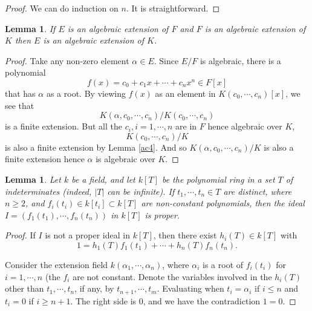 \documentclass[12pt]{report}
\newtheorem{lemma}[thm]{Lemma}
\theoremstyle{definition}
\def\aa{\alpha}
\begin{document}
\begin{proof}
    We can do induction on $n$. It is straightforward.
\end{proof}

\begin{lemma}\label{ac3}
    If $E$ is an algebraic extension of $F$ and $F$ is an algebraic extension of $K$ then $E$ is an algebraic extension of $K$.
\end{lemma}

\begin{proof}
    Take any non-zero element $\aa\in E$. Since $E/F$ is algebraic, there is a polynomial $$f(x)=c_0+c_1x+\cdots+c_n x^n\in F[x]$$ that has $\aa$ as a root. By viewing $f(x)$ as an element in $K(c_0,\cdots,c_n)[x]$, we see that $$K(\aa,c_0,\cdots,c_n)/K(c_0,\cdots,c_n)$$ is a finite extension. But all the $c_i, i=1,\cdots, n$ are in $F$ hence algebraic over $K$,$$K(c_0,\cdots,c_n)/K$$ is also a finite extension by Lemma \ref{ac4}. And so $K(\aa,c_0,\cdots,c_n)/K$ is also a finite extension hence $\aa$ is algebraic over $K$. 
\end{proof}

\begin{lemma}\label{ac2}
    Let $k$ be a field, and let $k[T]$ be the polynomial ring in a set $T$ of indeterminates (indeed, $|T|$ can be infinite). If $t_1, \cdots, t_n \in T$ are distinct, where $n \geq 2$, and $f_i(t_i) \in k[t_i] \subset k[T]$ are non-constant polynomials, then the ideal $I = (f_1(t_1),\cdots, f_n(t_n))$ in $k[T]$ is proper.
\end{lemma}

\begin{proof}
    If $I$ is not a proper ideal in $k[T]$, then there exist $h_i(T) \in k[T]$ with $$ 1 = h_1(T)f_1(t_1) + \cdots + h_n(T)f_n(t_n).$$

    Consider the extension field $k(\aa_1,\cdots,\aa_n)$, where $\aa_i$ is a root of $f_i(t_i)$ for $i = 1,\cdots , n$ (the $f_i$ are not constant. Denote the variables involved in the $h_i(T)$ other than $t_1,\cdots , t_n$, if any, by $t_{n+1}, \cdots , t_m$. Evaluating when $t_i = \aa_i$ if $i \leq n$ and $t_i = 0$ if $i \geq n + 1$. The right side is 0, and we have the contradiction $1 = 0$.
\end{proof}
\end{document}
